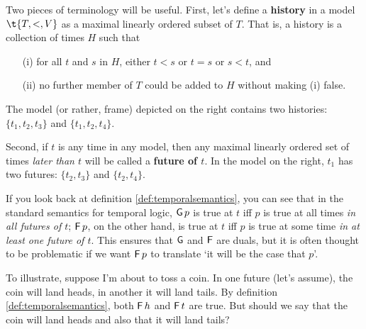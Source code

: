 Two pieces of terminology will be useful. First, let's define a \textbf{history}
in a model $\t{T,<,V}$ as a maximal linearly ordered subset of $T$. That is, a
history is a collection of times $H$ such that
\begin{itemize}[leftmargin=10mm]
  \itemsep0mm
\item[(i)] for all $t$ and $s$ in $H$, either $t<s$ or $t=s$ or $s<t$, and
\item[(ii)] no further member of $T$ could be added to $H$ without
  making (i) false.
\end{itemize}
%
\noindent
\begin{wrapfigure}{r}{4cm}
  \vspace{-8mm}
  \quad
  \vspace{-10mm}
\end{wrapfigure}

\noindent
The model (or rather, frame) depicted on the right contains two
histories: $\{ t_1, t_2, t_3 \}$ and $\{ t_1, t_2, t_4 \}$.

Second, if $t$ is any time in any model, then any maximal linearly ordered set
of times \emph{later than $t$} will be called a \textbf{future of $t$}. In the
model on the right, $t_1$ has two futures: $\{ t_2, t_3 \}$ and
$\{ t_2, t_4 \}$.

If you look back at definition \ref{def:temporalsemantics}, you can see that in
the standard semantics for temporal logic, $\operatorname{\mathsf{G}} p$ is true at $t$ iff $p$ is
true at all times \emph{in all futures of $t$}; $\operatorname{\mathsf{F}} p$, on the other hand, is
true at $t$ iff $p$ is true at some time \emph{in at least one future of $t$}.
This ensures that $\operatorname{\mathsf{G}}$ and $\operatorname{\mathsf{F}}$ are duals, but it is often thought to be
problematic if we want $\operatorname{\mathsf{F}} p$ to translate `it will be the case that $p$'.

To illustrate, suppose I'm about to toss a coin. In one future (let's assume),
the coin will land heads, in another it will land tails. By definition
\ref{def:temporalsemantics}, both $\operatorname{\mathsf{F}} h$ and $\operatorname{\mathsf{F}} t$ are true. But should we
say that the coin will land heads and also that it will land tails?

